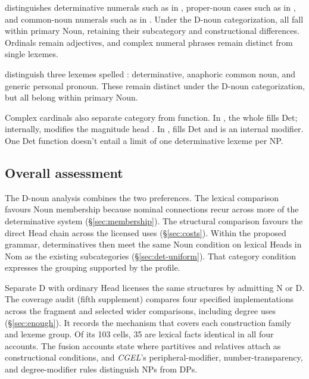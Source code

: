 \documentclass[12pt]{article}
\begin{document}
\textcite{reynolds2026numerals} distinguishes determinative numerals such as  in , proper-noun cases such as  in , and common-noun numerals such as  in . Under the D-noun categorization, all fall within primary Noun, retaining their subcategory and constructional differences. Ordinals remain adjectives, and complex numeral phrases remain distinct from single lexemes.

\textcite[797--798]{payne2013anaphoric} distinguish three lexemes spelled : determinative, anaphoric common noun, and generic personal pronoun. These remain distinct under the D-noun categorization, but all belong within primary Noun.

Complex cardinals also separate category from function. In , the whole  fills Det; internally,  modifies the magnitude head  \citep[§4]{reynolds2026numerals}. In ,  fills Det and  is an internal modifier. One Det function doesn't entail a limit of one determinative lexeme per NP.

\subsection{Overall assessment}\label{sec:overall-assessment}

The D-noun analysis combines the two preferences. The lexical comparison favours Noun membership because nominal connections recur across more of the determinative system (§\ref{sec:membership}). The structural comparison favours the direct Head chain across the licensed uses (§\ref{sec:costs}). Within the proposed grammar, determinatives then meet the same Noun condition on lexical Heads in Nom as the existing subcategories (§\ref{sec:det-uniform}). That category condition expresses the grouping supported by the profile.

Separate D with ordinary Head licenses the same structures by admitting N or D. The coverage audit (fifth supplement) compares four specified implementations across the fragment and selected wider comparisons, including degree uses (§\ref{sec:enough}). It records the mechanism that covers each construction family and lexeme group. Of its 103 cells, 35 are lexical facts identical in all four accounts. The fusion accounts state where partitives and relatives attach as constructional conditions, and \textit{CGEL}'s peripheral-modifier, number-transparency, and degree-modifier rules distinguish NPs from DPs.
\end{document}
